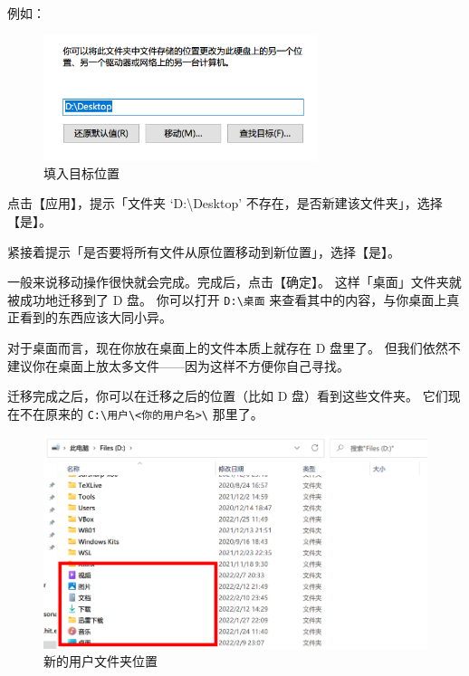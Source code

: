 例如：

\begin{figure}[htb!]
  \centering
  \includegraphics[width=8cm]{assets/Destination.png}
  \caption{填入目标位置}
  \label{Destination}
\end{figure}

点击【应用】，提示「文件夹 ‘D:\textbackslash{}Desktop’ 不存在，是否新建该文件夹」，选择【是】。

紧接着提示「是否要将所有文件从原位置移动到新位置」，选择【是】。

一般来说移动操作很快就会完成。完成后，点击【确定】。
这样「桌面」文件夹就被成功地迁移到了 D 盘。
你可以打开 \verb|D:\桌面| 来查看其中的内容，与你桌面上真正看到的东西应该大同小异。

\begin{note}
  对于桌面而言，现在你放在桌面上的文件本质上就存在 D 盘里了。
  但我们依然不建议你在桌面上放太多文件——因为这样不方便你自己寻找。
\end{note}



迁移完成之后，你可以在迁移之后的位置（比如 D 盘）看到这些文件夹。
它们现在不在原来的 \verb|C:\用户\<你的用户名>\| 那里了。

\begin{figure}[htb!]
  \centering
  \includegraphics[width=12cm]{assets/Moved_user_directories.png}
  \caption{新的用户文件夹位置}
  \label{Moved_user_directories}
\end{figure}

